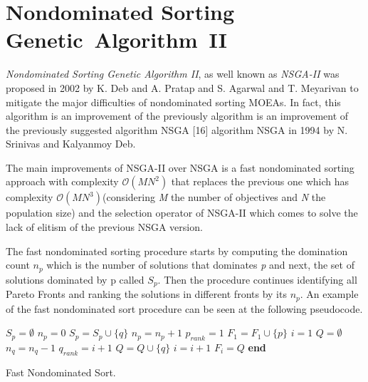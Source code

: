 \section{Nondominated Sorting Genetic~Algorithm~II}
\textit{Nondominated Sorting Genetic Algorithm II}, as well known as \textit{NSGA-II} was proposed in 2002 by K. Deb and A. Pratap and S. Agarwal and T. Meyarivan to mitigate the major difficulties of nondominated sorting MOEAs\cite{996017}. In fact, this algorithm is an improvement of the previously algorithm is an improvement of the previously suggested algorithm NSGA [16] algorithm NSGA\cite{Srinivas1994MuiltiobjectiveOU} in 1994 by N. Srinivas and Kalyanmoy Deb.

The main improvements of NSGA-II over NSGA is a fast nondominated sorting approach with complexity $\mathcal{O}(MN^{2})$ that replaces the previous one which has complexity $\mathcal{O}(MN^{3})$\cite{996017}(considering \textit{M} the number of objectives and \textit{N} the population size) and the selection operator of NSGA-II which comes to solve the lack of elitism of the previous NSGA version. 

The fast nondominated sorting procedure starts by computing the domination count $n_{p}$ which is the number of solutions that dominates \textit{p} and next, the set of solutions dominated by p called \textit{$S_{p}$}. Then the procedure continues identifying all Pareto Fronts and ranking the solutions in different fronts by its $n_{p}$\cite{996017}. An example of the fast nondominated sort procedure can be seen at the following pseudocode.

\begin{algorithm}[H]
\begin{algorithmic}[1]
    \State $S_{p} = \emptyset$
    \State $n_{p} = 0$
            \State $S_{p} = S_{p} \cup \{q\}$
        \Else {}
                \State $n_{p} = n_{p} + 1$
            \EndIf
        \EndIf
    \EndFor
        \State $p_{rank} = 1$
        \State $F_{1} = F_{1} \cup \{p\}$
    \EndIf
\EndFor
\State $i = 1$
    \State $Q = \emptyset$
            \State $n_{q} = n_{q} - 1$
                \State $q_{rank} = i + 1$
                \State $Q = Q \cup \{q\}$
            \EndIf
        \EndFor
    \EndFor
    \State $i = i + 1$
    \State $F_{i} = Q$
\EndWhile
\State \textbf{end}
\end{algorithmic}
\caption{Fast Nondominated Sort.}
\end{algorithm}

